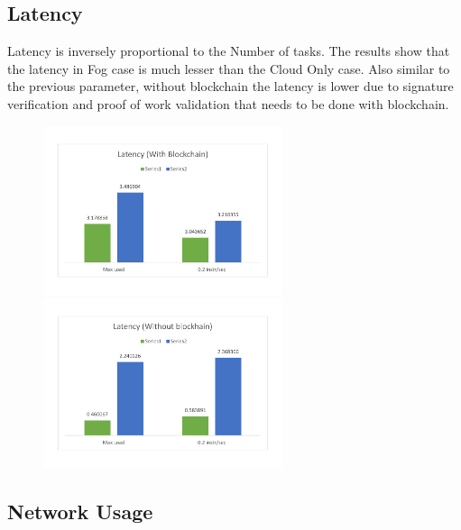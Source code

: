 \documentclass[AMA,STIX1COL]{WileyNJD-v2}
\begin{document}
\subsection{Latency}

Latency is inversely proportional to the Number of tasks. The results show that the latency in Fog case is much lesser than the Cloud Only case. Also similar to the previous parameter, without blockchain the latency is lower due to signature verification and proof of work validation that needs to be done with blockchain.
\begin{figure}[h]
\centering
\includegraphics[width=7cm]{g71} \ \ \ \ \ \ \ \ \ \ \       
\includegraphics[width=7cm]{g72}
\end{figure}

\subsection{Network Usage}
\end{document}
